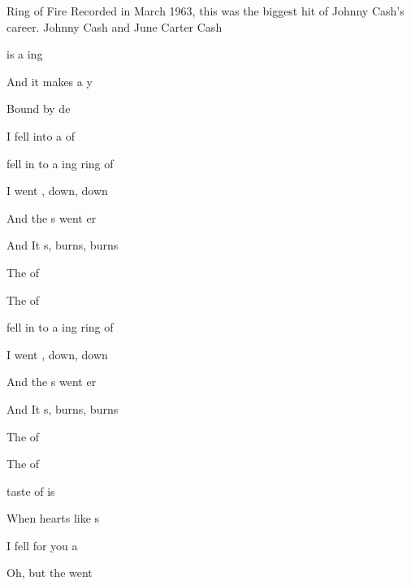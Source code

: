 \begin{SBSong}{Ring of Fire}
  {Recorded in March 1963, this was the biggest hit of Johnny Cash's career.}
  {Johnny Cash and June Carter Cash}
  \begin{SBVerse}
     is a ing 
    
    And it makes a y 
    
    Bound by  de
    
    I fell into a  of 
  \end{SBVerse}
  \begin{SBChorus}
     fell in to a ing ring of 
    
    I went , down, down
    
    And the s went er
    
    And It s, burns, burns
    
    The  of 
    
    The  of 
   
     fell in to a ing ring of 
    
    I went , down, down
    
    And the s went er
    
    And It s, burns, burns
    
    The  of 
    
    The  of 
  \end{SBChorus}
  \begin{SBVerse}
     taste of  is 
    
    When hearts like s 
    
    I fell for you  a 
    
    Oh, but the  went 
  \end{SBVerse}
\end{SBSong}
